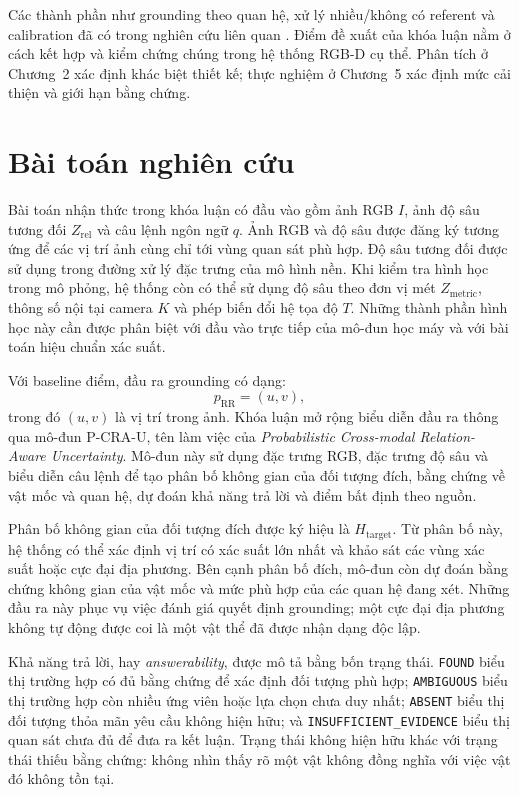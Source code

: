Các thành phần như grounding theo quan hệ, xử lý nhiều/không có referent và calibration đã có trong nghiên cứu liên quan \cite{yu2018mattnet,liu2023gres,guo2017calibration}. Điểm đề xuất của khóa luận nằm ở cách kết hợp và kiểm chứng chúng trong hệ thống RGB-D cụ thể. Phân tích ở Chương~2 xác định khác biệt thiết kế; thực nghiệm ở Chương~5 xác định mức cải thiện và giới hạn bằng chứng.

\section{Bài toán nghiên cứu}
\label{sec:introduction-problem}

Bài toán nhận thức trong khóa luận có đầu vào gồm ảnh RGB $I$, ảnh độ sâu tương đối $Z_{\mathrm{rel}}$ và câu lệnh ngôn ngữ $q$. Ảnh RGB và độ sâu được đăng ký tương ứng để các vị trí ảnh cùng chỉ tới vùng quan sát phù hợp. Độ sâu tương đối được sử dụng trong đường xử lý đặc trưng của mô hình nền. Khi kiểm tra hình học trong mô phỏng, hệ thống còn có thể sử dụng độ sâu theo đơn vị mét $Z_{\mathrm{metric}}$, thông số nội tại camera $K$ và phép biến đổi hệ tọa độ $T$. Những thành phần hình học này cần được phân biệt với đầu vào trực tiếp của mô-đun học máy và với bài toán hiệu chuẩn xác suất.

Với baseline điểm, đầu ra grounding có dạng:
\[
    p_{\mathrm{RR}} = (u,v),
\]
trong đó $(u,v)$ là vị trí trong ảnh. Khóa luận mở rộng biểu diễn đầu ra thông qua mô-đun P-CRA-U, tên làm việc của \textit{Probabilistic Cross-modal Relation-Aware Uncertainty}. Mô-đun này sử dụng đặc trưng RGB, đặc trưng độ sâu và biểu diễn câu lệnh để tạo phân bố không gian của đối tượng đích, bằng chứng về vật mốc và quan hệ, dự đoán khả năng trả lời và điểm bất định theo nguồn.

Phân bố không gian của đối tượng đích được ký hiệu là $H_{\mathrm{target}}$. Từ phân bố này, hệ thống có thể xác định vị trí có xác suất lớn nhất và khảo sát các vùng xác suất hoặc cực đại địa phương. Bên cạnh phân bố đích, mô-đun còn dự đoán bằng chứng không gian của vật mốc và mức phù hợp của các quan hệ đang xét. Những đầu ra này phục vụ việc đánh giá quyết định grounding; một cực đại địa phương không tự động được coi là một vật thể đã được nhận dạng độc lập.

Khả năng trả lời, hay \textit{answerability}, được mô tả bằng bốn trạng thái. \texttt{FOUND} biểu thị trường hợp có đủ bằng chứng để xác định đối tượng phù hợp; \texttt{AMBIGUOUS} biểu thị trường hợp còn nhiều ứng viên hoặc lựa chọn chưa duy nhất; \texttt{ABSENT} biểu thị đối tượng thỏa mãn yêu cầu không hiện hữu; và \texttt{INSUFFICIENT\_EVIDENCE} biểu thị quan sát chưa đủ để đưa ra kết luận. Trạng thái không hiện hữu khác với trạng thái thiếu bằng chứng: không nhìn thấy rõ một vật không đồng nghĩa với việc vật đó không tồn tại.

